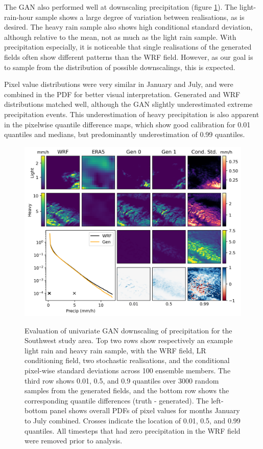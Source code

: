 \documentclass{ametsocV6.1}
\begin{document}
The GAN also performed well at downscaling precipitation (figure \ref{precip}). The light-rain-hour sample shows a large degree of variation between realisations, as is desired. The heavy rain sample also shows high conditional standard deviation, although relative to the mean, not as much as the light rain sample. With precipitation especially, it is noticeable that single realisations of the generated fields often show different patterns than the WRF field. However, as our goal is to sample from the distribution of possible downscalings, this is expected. 

Pixel value distributions were very similar in January and July, and were combined in the PDF for better visual interpretation. Generated and WRF distributions matched well, although the GAN slightly underestimated extreme precipitation events. This underestimation of heavy precipitation is also apparent in the pixelwise quantile difference maps, which show good calibration for 0.01 quantiles and medians, but predominantly underestimation of 0.99 quantiles.  
\begin{figure}[H]
  \noindent\includegraphics[width=\textwidth,angle=0]{final/Precip_Fig.png}\\
  \caption{Evaluation of univariate GAN downscaling of precipitation for the Southwest study area. Top two rows show respectively an example light rain and heavy rain sample, with the WRF field, LR conditioning field, two stochastic realisations, and the conditional pixel-wise standard deviations across 100 ensemble members. The third row shows 0.01, 0.5, and 0.9 quantiles over 3000 random samples from the generated fields, and the bottom row shows the corresponding quantile differences (truth - generated). The left-bottom panel shows overall PDFs of pixel values for months January to July combined. Crosses indicate the location of 0.01, 0.5, and 0.99 quantiles. All timesteps that had zero precipitation in the WRF field were removed prior to analysis.}\label{precip}
\end{figure}
\end{document}
